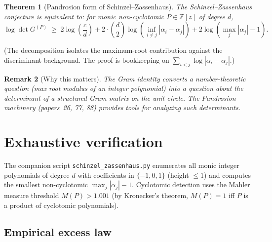 \documentclass[11pt,a4paper]{article}
\newtheorem{theorem}{Theorem}[section]
\newtheorem{remark}[theorem]{Remark}
\begin{document}
\begin{theorem}[Pandrosion form of Schinzel--Zassenhaus]\label{thm:reform}
The Schinzel--Zassenhaus conjecture is equivalent to: for monic non-cyclotomic
$P \in \mathbb{Z}[z]$ of degree $d$,
\[
\log \det G^{(P)} \;\ge\; 2 \log\!\left(\frac{c}{d}\right) +
2 \cdot \binom{d}{2} \log\!\left(\inf_{i \ne j} |\alpha_i - \alpha_j|\right) +
2 \log\!\left(\max_j |\alpha_j| - 1\right).
\]
\end{theorem}

\noindent (The decomposition isolates the maximum-root contribution against the
discriminant background. The proof is bookkeeping on $\sum_{i<j} \log|\alpha_i - \alpha_j|$.)

\begin{remark}[Why this matters]
The Gram identity converts a number-theoretic question (max root modulus of an
integer polynomial) into a question about the determinant of a structured Gram
matrix on the unit circle. The Pandrosion machinery (papers~26, 77, 88) provides
tools for analyzing such determinants.
\end{remark}

\section{Exhaustive verification}\label{sec:numerics}

The companion script \texttt{schinzel\_zassenhaus.py} enumerates all monic
integer polynomials of degree $d$ with coefficients in $\{-1, 0, 1\}$ (height
$\le 1$) and computes the smallest non-cyclotomic $\max_j |\alpha_j| - 1$.
Cyclotomic detection uses the Mahler measure threshold $M(P) > 1.001$
(by Kronecker's theorem, $M(P) = 1$ iff $P$ is a product of cyclotomic
polynomials).

\subsection{Empirical excess law}
\end{document}

